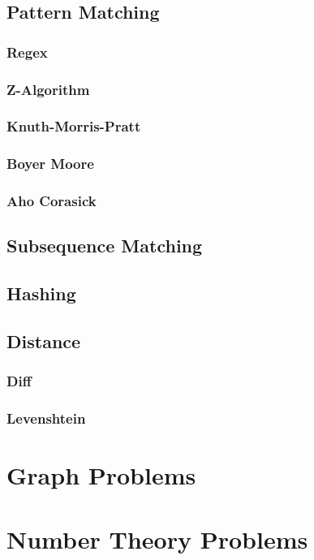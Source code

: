 \documentclass[12pt]{article}
\begin{document}
\subsection{Pattern Matching}
\subsubsection{Regex}
\subsubsection{Z-Algorithm}
\subsubsection{Knuth-Morris-Pratt}
\subsubsection{Boyer Moore}
\subsubsection{Aho Corasick}
\subsection{Subsequence Matching}
\subsection{Hashing}
\subsection{Distance}
\subsubsection{Diff}
\subsubsection{Levenshtein}

\hspace{0mm}

\section{Graph Problems}

\hspace{0mm}

\section{Number Theory Problems}
\end{document}
